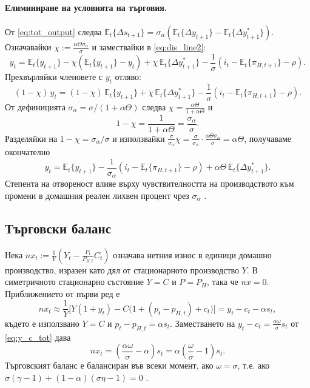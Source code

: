 \paragraph{Елиминиране на условията на търговия.}
От \eqref{eq:tot_output} следва $\mathbb{E}_t\{\Delta s_{t+1}\} = \sigma_\alpha\left( \mathbb{E}_t\{\Delta y_{t+1}\} - \mathbb{E}_t\{\Delta y^*_{t+1}\} \right)$. Означавайки $\chi := \frac{\alpha\Theta\sigma_\alpha}{\sigma}$ и замествайки в \eqref{eq:dis_line2}:
\[
y_t = \mathbb{E}_t\{y_{t+1}\} - \chi\left( \mathbb{E}_t\{y_{t+1}\} - y_t \right) + \chi\,\mathbb{E}_t\{\Delta y^*_{t+1}\}
- \frac{1}{\sigma}\left( i_t - \mathbb{E}_t\{\pi_{H,t+1}\} - \rho \right).
\]
Прехвърляйки членовете с $y_t$ отляво:
\[
(1-\chi)\, y_t = (1-\chi)\, \mathbb{E}_t\{y_{t+1}\} + \chi\,\mathbb{E}_t\{\Delta y^*_{t+1}\}
- \frac{1}{\sigma}\left( i_t - \mathbb{E}_t\{\pi_{H,t+1}\} - \rho \right).
\]
От дефиницията $\sigma_\alpha = \sigma/(1+\alpha\Theta)$ следва $\chi = \frac{\alpha\Theta}{1+\alpha\Theta}$ и
\[
1 - \chi = \frac{1}{1+\alpha\Theta} = \frac{\sigma_\alpha}{\sigma}.
\]
Разделяйки на $1-\chi = \sigma_\alpha/\sigma$ и използвайки $\frac{\sigma}{\sigma_\alpha}\chi = \frac{\sigma}{\sigma_\alpha}\cdot\frac{\alpha\Theta\sigma_\alpha}{\sigma} = \alpha\Theta$, получаваме окончателно
\begin{equation}
y_t = \mathbb{E}_t\{ y_{t+1} \} - \frac{1}{\sigma_\alpha} \left( i_t - \mathbb{E}_t\{\pi_{H,t+1}\} - \rho \right)
+ \alpha\Theta\, \mathbb{E}_t\{ \Delta y^*_{t+1} \}.
\label{eq:dis_levels}
\end{equation}
Степента на отвореност влияе върху чувствителността на производството към промени в домашния реален лихвен процент чрез $\sigma_\alpha$ \parencite[с.~161]{Gali2008}.

\subsection{Търговски баланс}

Нека $nx_t := \frac{1}{Y}\left( Y_t - \frac{P_t}{P_{H,t}} C_t \right)$ означава нетния износ в единици домашно производство, изразен като дял от стационарното производство $Y$. В симетричното стационарно състояние $Y = C$ и $P = P_H$, така че $nx = 0$. Приближението от първи ред е
\[
nx_t \approx \frac{1}{Y}\Big[ Y(1 + y_t) - C\big( 1 + (p_t - p_{H,t}) + c_t \big) \Big]
= y_t - c_t - \alpha s_t,
\]
където е използвано $Y = C$ и $p_t - p_{H,t} = \alpha s_t$. Заместването на $y_t - c_t = \frac{\alpha\omega}{\sigma}s_t$ от \eqref{eq:y_c_tot} дава
\begin{equation}
nx_t = \left( \frac{\alpha\omega}{\sigma} - \alpha \right) s_t
= \alpha \left( \frac{\omega}{\sigma} - 1 \right) s_t.
\label{eq:net_exports}
\end{equation}
Търговският баланс е балансиран във всеки момент, ако $\omega = \sigma$, т.е. ако $\sigma(\gamma-1) + (1-\alpha)(\sigma\eta-1) = 0$ \parencite[с.~162]{Gali2008}.

